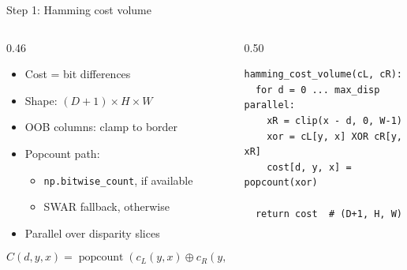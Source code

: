 \documentclass[aspectratio=169,11pt]{beamer}
\newcommand{\code}[1]{\texttt{#1}}
\begin{document}
\begin{frame}[fragile]{Step 1: Hamming cost volume}
\begin{columns}[T,totalwidth=\textwidth]
\begin{column}{0.46\textwidth}
\begin{itemize}
    \item Cost = bit differences
    \item Shape: $(D+1)\times H\times W$
    \item OOB columns: clamp to border
    \item Popcount path:
    \begin{itemize}
        \item \code{np.bitwise\_count}, if available
        \item SWAR fallback, otherwise
    \end{itemize}
    \item Parallel over disparity slices
\end{itemize}
\vspace{-0.2em}
\[
C(d,y,x)=\operatorname{popcount}(c_L(y,x)\oplus c_R(y,x-d))
\]
\end{column}
\begin{column}{0.50\textwidth}
\scriptsize
\begin{verbatim}
hamming_cost_volume(cL, cR):
  for d = 0 ... max_disp parallel:
    xR = clip(x - d, 0, W-1)
    xor = cL[y, x] XOR cR[y, xR]
    cost[d, y, x] = popcount(xor)

  return cost  # (D+1, H, W)
\end{verbatim}
\end{column}
\end{columns}
\end{frame}


\end{document}

